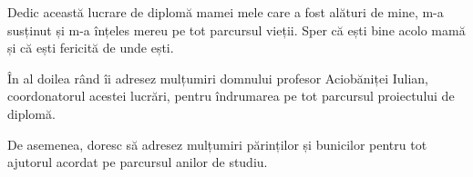 \pagestyle{empty}
\vspace*{7cm}

Dedic această lucrare de diplomă mamei mele care a fost alături de mine, m-a susținut și m-a înțeles mereu pe tot parcursul vieții. Sper că ești bine acolo mamă și că ești fericită de unde ești.

În al doilea rând îi adresez mulțumiri domnului profesor Aciobăniței Iulian, coordonatorul acestei lucrări, pentru îndrumarea pe tot parcursul proiectului de diplomă. 

De asemenea, doresc să adresez mulțumiri părinților și bunicilor pentru tot ajutorul acordat pe parcursul anilor de studiu. 

\newpage
